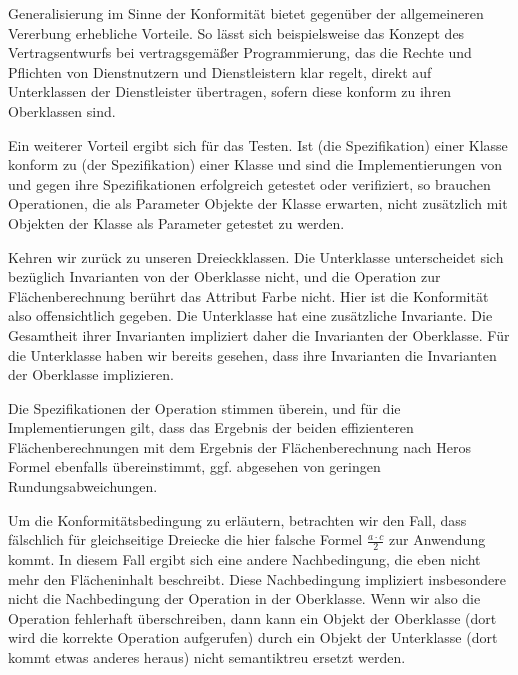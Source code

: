 Generalisierung im Sinne der Konformität bietet gegenüber der allgemeineren Vererbung erhebliche Vorteile. So lässt sich beispielsweise das Konzept des Vertragsentwurfs bei vertragsgemäßer Programmierung, das die Rechte und Pflichten von Dienstnutzern und Dienstleistern klar regelt, direkt auf Unterklassen der Dienst\-leister übertragen, sofern diese konform zu ihren Oberklassen sind.

Ein weiterer Vorteil ergibt sich für das Testen. Ist (die Spezifikation) einer Klasse  konform zu (der Spezifikation) einer Klasse  und sind die Implementierungen von  und  gegen ihre Spezifikationen erfolgreich getestet oder verifiziert, so brauchen Operationen, die als Parameter Objekte der Klasse  erwarten, nicht zusätzlich mit Objekten der Klasse  als Parameter getestet zu werden.

Kehren wir zurück zu unseren Dreieckklassen. Die Unterklasse  unterscheidet sich bezüglich Invarianten von der Oberklasse nicht, und die Opera\-tion zur Flächenberechnung berührt das Attribut Farbe nicht. Hier ist die Konformität also offensichtlich gegeben. Die Unterklasse  hat eine zusätzliche Invariante. Die Gesamtheit ihrer Invarianten impliziert daher die Invarianten der Oberklasse. Für die Unterklasse  haben wir bereits gesehen, dass ihre Invarianten die Invarianten der Oberklasse implizieren.

Die Spezifikationen der Operation stimmen überein, und für die Implementierungen gilt, dass das Ergebnis der beiden effizienteren Flächenberechnungen mit dem Ergebnis der Flächenberechnung nach Heros Formel ebenfalls übereinstimmt, ggf. abgesehen von geringen Rundungsabweichungen. 

\pagebreak %

Um die Konformitätsbedingung zu erläutern, betrachten wir den Fall, dass fälschlich für gleichseitige Dreiecke die hier falsche Formel $\frac{a \cdot c}{2} $ zur Anwendung kommt. In diesem Fall ergibt sich eine andere Nachbedingung, die eben nicht mehr den Flächen\-inhalt beschreibt. Diese Nachbedingung impliziert insbesondere nicht die Nachbedingung der Operation in der Oberklasse. Wenn wir also die Operation fehlerhaft überschreiben, dann kann ein Objekt der Oberklasse (dort wird die korrekte Operation aufgerufen) durch ein Objekt der Unterklasse (dort kommt etwas anderes heraus) nicht semantiktreu ersetzt werden.

